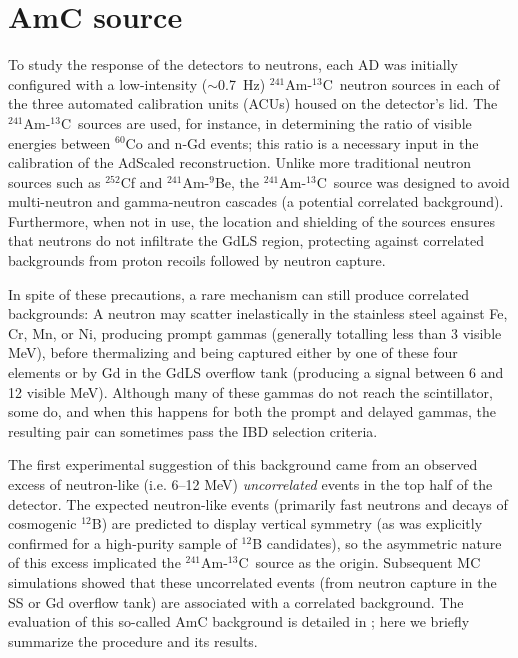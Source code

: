 \documentclass[../thesis.tex]{subfiles}
\begin{document}
\newcommand\AmC{$^{241}$Am-$^{13}$C}

\section{AmC source}

To study the response of the detectors to neutrons, each AD was initially
configured with a low-intensity ($\sim$0.7~Hz) \AmC\ neutron sources in each of
the three automated calibration units (ACUs) housed on the detector's lid. The
\AmC\ sources are used, for instance, in determining the ratio of visible
energies between $^{60}$Co and n-Gd events; this ratio is a necessary input in
the calibration of the AdScaled reconstruction. Unlike more traditional neutron
sources such as $^{252}$Cf and $^{241}$Am-$^{9}$Be, the \AmC\ source was
designed to avoid multi-neutron and gamma-neutron cascades (a potential
correlated background). Furthermore, when not in use, the location and shielding
of the sources ensures that neutrons do not infiltrate the GdLS region,
protecting against correlated backgrounds from proton recoils followed by
neutron capture.

In spite of these precautions, a rare mechanism can still produce correlated
backgrounds: A neutron may scatter inelastically in the stainless steel against
Fe, Cr, Mn, or Ni, producing prompt gammas (generally totalling less than 3
visible MeV), before thermalizing and being captured either by one of these four
elements or by Gd in the GdLS overflow tank (producing a signal between 6 and 12
visible MeV). Although many of these gammas do not reach the scintillator, some
do, and when this happens for both the prompt and delayed gammas, the resulting
pair can sometimes pass the IBD selection criteria.

The first experimental suggestion of this background came from an observed
excess of neutron-like (i.e. 6--12 MeV) \emph{uncorrelated} events in the top
half of the detector. The expected neutron-like events (primarily fast neutrons
and decays of cosmogenic $^{12}$B) are predicted to display vertical symmetry
(as was explicitly confirmed for a high-purity sample of $^{12}$B candidates),
so the asymmetric nature of this excess implicated the \AmC\ source as the
origin. Subsequent MC simulations showed that these uncorrelated events (from
neutron capture in the SS or Gd overflow tank) are associated with a correlated
background. The evaluation of this so-called AmC background is detailed in
\cite{Gu_2016}; here we briefly summarize the procedure and its results.
\end{document}

